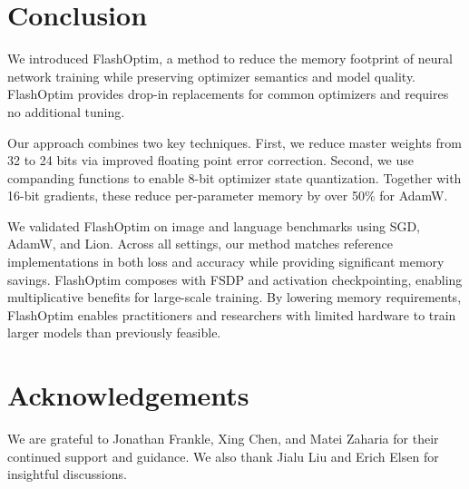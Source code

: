 \documentclass[10pt,twocolumn,letterpaper]{article}
\theoremstyle{plain}
\theoremstyle{definition}
\theoremstyle{remark}
\newcommand{\flashOptim}{FlashOptim\xspace}
\begin{document}
\section{Conclusion} \label{sec:conclusion}


We introduced \flashOptim, a method to reduce the memory footprint of neural 
network training while preserving optimizer semantics and model quality.
\flashOptim provides drop-in replacements for common optimizers and requires 
no additional tuning.

Our approach combines two key techniques. First, we reduce master weights from 32 to 24 bits  via improved floating point error correction. Second, we use companding functions to enable 8-bit optimizer state quantization. Together with 16-bit gradients, these reduce per-parameter memory by over 50\% for AdamW.

We validated \flashOptim on image and language benchmarks using SGD, AdamW, and Lion.
Across all settings, our method matches reference implementations in both loss and accuracy while providing significant memory savings.
\flashOptim composes with FSDP and activation checkpointing, enabling multiplicative benefits for large-scale training.
By lowering memory requirements, \flashOptim enables practitioners and researchers with limited hardware to train larger models than previously feasible.


\section*{Acknowledgements}

We are grateful to Jonathan Frankle, Xing Chen, and Matei Zaharia for their continued support and guidance. We also thank Jialu Liu and Erich Elsen for insightful discussions.
\end{document}
